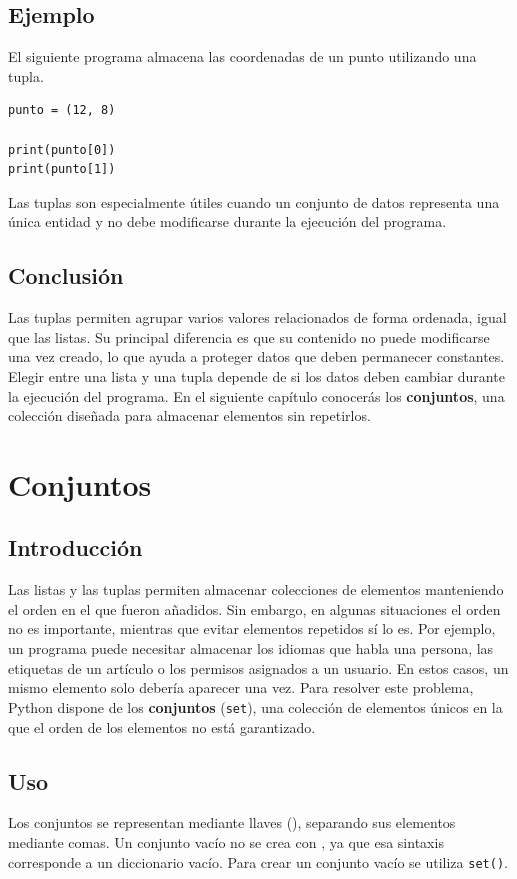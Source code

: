 \documentclass[11pt,a5paper,twoside]{book}
\begin{document}
\subsection{Ejemplo}
El siguiente programa almacena las coordenadas de un punto utilizando una tupla.


\begin{tcolorbox}
\scriptsize
 \begin{verbatim}
punto = (12, 8)

print(punto[0])
print(punto[1])
\end{verbatim}
\end{tcolorbox}
Las tuplas son especialmente útiles cuando un conjunto de datos representa una única entidad y no debe modificarse durante la ejecución del programa.
\subsection{Conclusión}
Las tuplas permiten agrupar varios valores relacionados de forma ordenada, igual que las listas. Su principal diferencia es que su contenido no puede modificarse una vez creado, lo que ayuda a proteger datos que deben permanecer constantes.
Elegir entre una lista y una tupla depende de si los datos deben cambiar durante la ejecución del programa.
En el siguiente capítulo conocerás los \textbf{conjuntos}, una colección diseñada para almacenar elementos sin repetirlos.

\newpage

\section{Conjuntos}
\subsection{Introducción}
Las listas y las tuplas permiten almacenar colecciones de elementos manteniendo el orden en el que fueron añadidos. Sin embargo, en algunas situaciones el orden no es importante, mientras que evitar elementos repetidos sí lo es.
Por ejemplo, un programa puede necesitar almacenar los idiomas que habla una persona, las etiquetas de un artículo o los permisos asignados a un usuario. En estos casos, un mismo elemento solo debería aparecer una vez.
Para resolver este problema, Python dispone de los \textbf{conjuntos} ({\scriptsize \texttt{set}}), una colección de elementos únicos en la que el orden de los elementos no está garantizado.
\subsection{Uso}
Los conjuntos se representan mediante llaves ({\scriptsize \texttt{{}}}), separando sus elementos mediante comas.
Un conjunto vacío no se crea con {\scriptsize \texttt{{}}}, ya que esa sintaxis corresponde a un diccionario vacío. Para crear un conjunto vacío se utiliza {\scriptsize \texttt{set()}}.
\end{document}
